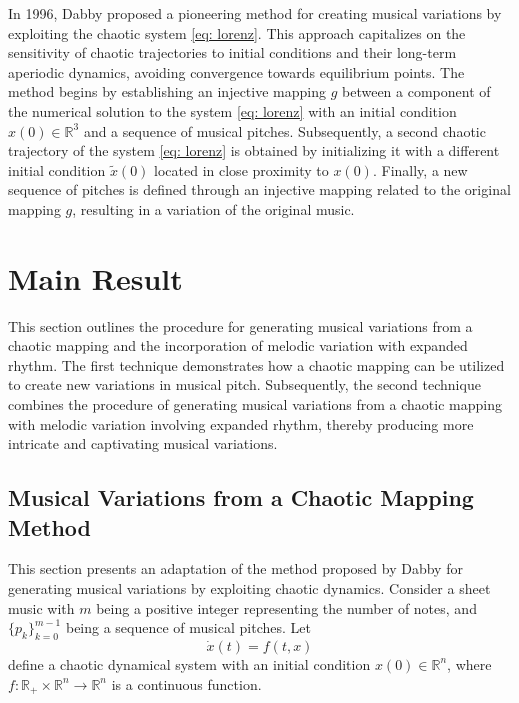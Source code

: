 \documentclass[11pt]{article}
\theoremstyle{definition}
\begin{document}
In 1996, Dabby \cite{dabby_musical_1996} proposed a pioneering method for creating musical variations by exploiting the chaotic system \eqref{eq: lorenz}. 
This approach capitalizes on the sensitivity of chaotic trajectories to initial conditions and their long-term aperiodic dynamics, avoiding convergence towards equilibrium points. 
The method begins by establishing an injective mapping $g$ between a component of the numerical solution to the system \eqref{eq: lorenz} with an initial condition $x(0) \in \mathbb{R}^3$ and a sequence of musical pitches. 
Subsequently, a second chaotic trajectory of the system \eqref{eq: lorenz} is obtained by initializing it with a different initial condition $\tilde{x}(0)$ located in close proximity to $x(0)$. 
Finally, a new sequence of pitches is defined through an injective mapping related to the original mapping $g$, resulting in a variation of the original music.

\section{Main Result}
\label{sec: mainresult}
This section outlines the procedure for generating musical variations from a chaotic mapping and the incorporation of melodic variation with expanded rhythm. 
The first technique demonstrates how a chaotic mapping can be utilized to create new variations in musical pitch. 
Subsequently, the second technique combines the procedure of generating musical variations from a chaotic mapping with melodic variation involving expanded rhythm, thereby producing more intricate and captivating musical variations.

\subsection{Musical Variations from a Chaotic Mapping Method}
\label{ss: mvfacm}

This section presents an adaptation of the method proposed by Dabby \cite{dabby_musical_1996} for generating musical variations by exploiting chaotic dynamics.
Consider a sheet music with $m$ being a positive integer representing the number of notes, and $\displaystyle\{p_k\}_{k=0}^{m-1}$ being a sequence of musical pitches. Let
\begin{equation} \label{eq: odes}
\dot{x}(t) = f(t,x)
\end{equation}
define a chaotic dynamical system with an initial condition $x(0) \in \mathbb{R}^n$, where $f: \mathbb{R}_{+} \times \mathbb{R}^n \to \mathbb{R}^n$ is a continuous function.
\end{document}
